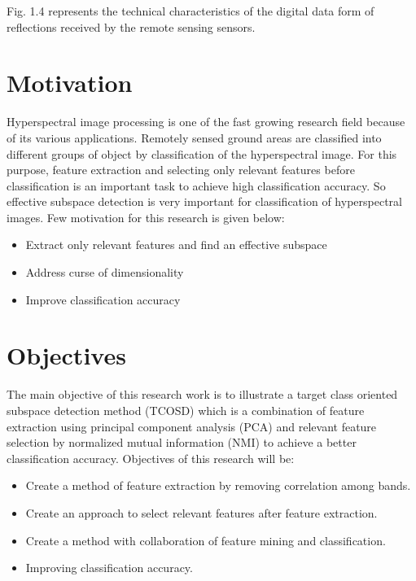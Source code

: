 \documentclass[document.tex]{subfiles}
\begin{document}
\noindent Fig. 1.4 represents the technical characteristics of the digital data form of reflections received by the remote sensing sensors.



\section{Motivation}
\noindent Hyperspectral image processing is  one of the fast growing research field because of its various applications. Remotely sensed ground areas are classified into different groups of object by classification of the hyperspectral image. For this purpose, feature extraction and selecting only relevant features before classification is an important task to achieve high classification accuracy. So effective subspace detection is very important for classification of hyperspectral images. Few motivation for this research is given below:
\begin{itemize}
	\item Extract only relevant features and find an effective subspace
	\item Address curse of dimensionality\cite{1}
	\item Improve classification accuracy
\end{itemize}

\section{Objectives}
\noindent The main objective of this research work is to illustrate a target class oriented subspace detection method (TCOSD) which is a combination of feature extraction using principal component analysis (PCA) and relevant feature selection by normalized mutual information (NMI) to achieve a better classification accuracy. Objectives of this research will be:
\begin{itemize}
	\item Create a method of feature extraction by removing correlation among bands.
	\item Create an approach to select relevant features after feature extraction.
	\item Create a method with collaboration of feature mining and classification.
	\item Improving classification accuracy.
\end{itemize}
\end{document}
